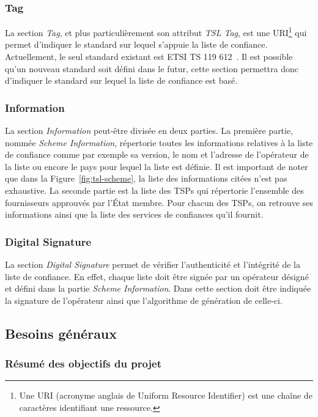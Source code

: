 \documentclass{tnreport}
\begin{document}
\subsubsection{Tag}

La section \textit{Tag}, et plus particulièrement son attribut \textit{TSL Tag}, est une URI\footnote{Une URI (acronyme anglais de Uniform Resource Identifier) est une chaîne de caractères identifiant une ressource.} qui permet d'indiquer le standard sur lequel s'appuie la liste de confiance. Actuellement, le seul standard  existant est ETSI TS 119 612~\cite{ETSITS119612}. Il est possible qu'un nouveau standard soit défini dans le futur, cette section permettra donc d'indiquer le standard sur lequel la liste de confiance est basé.

\subsubsection{Information}

La section \textit{Information} peut-être divisée en deux parties. 
La première partie, nommée \textit{Scheme Information}, répertorie toutes les informations relatives à la liste de confiance comme par exemple sa version, le nom et l'adresse de l'opérateur de la liste ou encore le pays pour lequel la liste est définie. Il est important de noter que dans la Figure~\ref{fig:tsl-scheme}, la liste des informations citées n'est pas exhaustive. 
La seconde partie est la liste des TSPs qui répertorie l'ensemble des fournisseurs approuvés par l'État membre. Pour chacun des TSPs, on retrouve ses informations ainsi que la liste des services de confiances qu'il fournit.

\subsubsection{Digital Signature}

La section \textit{Digital Signature} permet de vérifier l'authenticité et l'intégrité de la liste de confiance. En effet, chaque liste doit être signée par un opérateur désigné et défini dans la partie \textit{Scheme Information}. Dans cette section doit être indiquée la signature de l'opérateur ainsi que l'algorithme de génération de celle-ci.

\subsection{Besoins généraux}

\subsubsection{Résumé des objectifs du projet}
\end{document}
